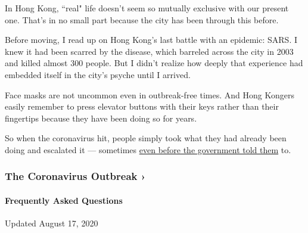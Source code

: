 In Hong Kong, ``real" life doesn't seem so mutually exclusive with our
present one. That's in no small part because the city has been through
this before.

Before moving, I read up on Hong Kong's last battle with an epidemic:
SARS. I knew it had been scarred by the disease, which barreled across
the city in 2003 and killed almost 300 people. But I didn't realize how
deeply that experience had embedded itself in the city's psyche until I
arrived.

Face masks are not uncommon even in outbreak-free times. And Hong
Kongers easily remember to press elevator buttons with their keys rather
than their fingertips because they have been doing so for years.

So when the coronavirus hit, people simply took what they had already
been doing and escalated it --- sometimes
\href{https://www.statnews.com/2020/03/26/coronavirus-hong-kong-resurgenece-holds-lesson-defeating-it-demands-persistence/}{even
before the government told them} to.

\href{https://www.nytimes3xbfgragh.onion/news-event/coronavirus?action=click\&pgtype=Article\&state=default\&region=MAIN_CONTENT_3\&context=storylines_faq}{}

\hypertarget{the-coronavirus-outbreak-}{%
\subsubsection{The Coronavirus Outbreak
›}\label{the-coronavirus-outbreak-}}

\hypertarget{frequently-asked-questions}{%
\paragraph{Frequently Asked
Questions}\label{frequently-asked-questions}}

Updated August 17, 2020

